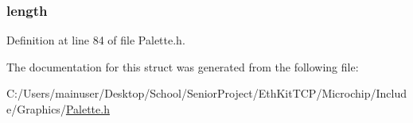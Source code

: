 \hypertarget{struct_p_a_l_e_t_t_e___h_e_a_d_e_r_ac03f72dfd2e32790101f1221796ea289}{}
\subsubsection[{length}]{ length}\label{struct_p_a_l_e_t_t_e___h_e_a_d_e_r_ac03f72dfd2e32790101f1221796ea289}


Definition at line 84 of file Palette.\+h.



The documentation for this struct was generated from the following file\+:\begin{DoxyCompactItemize}
\item 
C\+:/\+Users/mainuser/\+Desktop/\+School/\+Senior\+Project/\+Eth\+Kit\+T\+C\+P/\+Microchip/\+Include/\+Graphics/\hyperlink{_palette_8h}{Palette.\+h}\end{DoxyCompactItemize}
